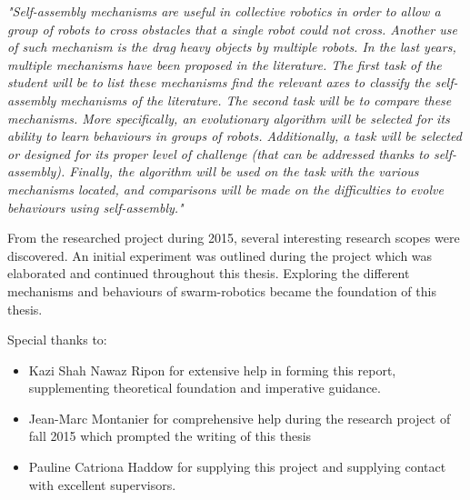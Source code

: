 \documentclass[a4paper,12pt,twoside,openright]{book}
\begin{document}
\begin{center}
	
	\textit{"Self-assembly mechanisms are useful in collective robotics in order to allow a group of robots to cross obstacles that a single robot could not cross. Another use of such mechanism is the drag heavy objects by multiple robots. In the last years,  multiple mechanisms have been proposed in the literature. The first task of the student will be to list these mechanisms find the relevant axes to classify the self-assembly mechanisms of the literature. The second task will be to compare these mechanisms. More specifically, an evolutionary algorithm will be selected for its ability to learn behaviours in groups of robots. Additionally, a task will be selected or designed for its proper level of challenge (that can be addressed thanks to self-assembly). Finally, the algorithm will be used on the task with the various mechanisms located, and comparisons will be made on the difficulties to evolve behaviours using self-assembly."\\}
	
\end{center}

From the researched project during 2015, several interesting research scopes were discovered.
An initial experiment was outlined during the project which was elaborated and continued throughout this thesis.
Exploring the different mechanisms and behaviours of swarm-robotics became the foundation of this thesis.

Special thanks to:

\begin{itemize}
	
	\item Kazi Shah Nawaz Ripon for extensive help in forming this report, supplementing theoretical foundation and imperative guidance.
	
	\item Jean-Marc Montanier for comprehensive help during the research project of fall 2015 which prompted the writing of this thesis
	
	\item Pauline Catriona Haddow for supplying this project and supplying contact with excellent supervisors.

\end{itemize}

\tableofcontents

\newpage
\listoffigures
\newpage
\listoftables

\mainmatter
\pagestyle{main}
\end{document}
